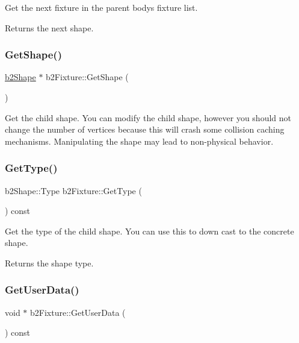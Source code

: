 Get the next fixture in the parent body\textquotesingle{}s fixture list. \begin{DoxyReturn}{Returns}
the next shape. 
\end{DoxyReturn}
\mbox{\label{classb2Fixture_aaa2b73fa212fa53b1c800cccd7a1d31e}} 
\subsubsection{\texorpdfstring{Get\+Shape()}{GetShape()}}
{\footnotesize\ttfamily \mbox{\hyperlink{classb2Shape}{b2\+Shape}} $\ast$ b2\+Fixture\+::\+Get\+Shape (\begin{DoxyParamCaption}{ }\end{DoxyParamCaption})\hspace{0.3cm}{\ttfamily [inline]}}

Get the child shape. You can modify the child shape, however you should not change the number of vertices because this will crash some collision caching mechanisms. Manipulating the shape may lead to non-\/physical behavior. \mbox{\label{classb2Fixture_a7a566c1e3b768f6a72ebc3b758aad70e}} 
\subsubsection{\texorpdfstring{Get\+Type()}{GetType()}}
{\footnotesize\ttfamily b2\+Shape\+::\+Type b2\+Fixture\+::\+Get\+Type (\begin{DoxyParamCaption}{ }\end{DoxyParamCaption}) const\hspace{0.3cm}{\ttfamily [inline]}}

Get the type of the child shape. You can use this to down cast to the concrete shape. \begin{DoxyReturn}{Returns}
the shape type. 
\end{DoxyReturn}
\mbox{\label{classb2Fixture_ae2a865ed59ffe9b1cb89f577052f4d50}} 
\subsubsection{\texorpdfstring{Get\+User\+Data()}{GetUserData()}}
{\footnotesize\ttfamily void $\ast$ b2\+Fixture\+::\+Get\+User\+Data (\begin{DoxyParamCaption}{ }\end{DoxyParamCaption}) const\hspace{0.3cm}{\ttfamily [inline]}}

